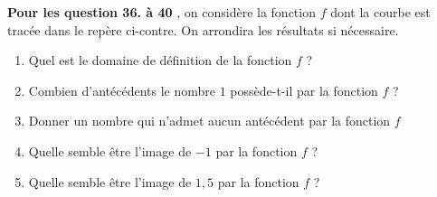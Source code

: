 \documentclass[oneside,12pt]{article}          %
\begin{document}

\begin{minipage}{0.6\linewidth} \restoreskip
\textbf{Pour les question 36. à 40} , on considère la fonction $f$ dont la courbe est tracée dans le repère ci-contre. On arrondira les résultats si nécessaire.
	\begin{enumerate}[resume]
		\item Quel est le domaine de définition de la fonction $f$ ?
		\item Combien d'antécédents le nombre $1$ possède-t-il par la fonction $f$ ?
		\item Donner un nombre qui n'admet aucun antécédent par la fonction $f$
		\item Quelle semble être l'image de $-1$ par la fonction $f$ ?
		\item Quelle semble être l'image de $1,5$ par la fonction $f$ ?
	\end{enumerate}
\end{minipage}
\begin{minipage}{0.4\linewidth}
\end{minipage}
\end{document}

